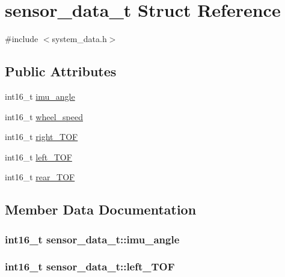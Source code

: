 \hypertarget{structsensor__data__t}{}\section{sensor\+\_\+data\+\_\+t Struct Reference}
\label{structsensor__data__t}


{\ttfamily \#include $<$system\+\_\+data.\+h$>$}

\subsection*{Public Attributes}
\begin{DoxyCompactItemize}
\item 
int16\+\_\+t \hyperlink{structsensor__data__t_aba3eb0564055c7b08a699140643a1917}{imu\+\_\+angle}
\item 
int16\+\_\+t \hyperlink{structsensor__data__t_a9bf1052ed7b8733732b86a5514bffa67}{wheel\+\_\+speed}
\item 
int16\+\_\+t \hyperlink{structsensor__data__t_a0a5ace9e72835c96a0620b148309df1e}{right\+\_\+\+T\+OF}
\item 
int16\+\_\+t \hyperlink{structsensor__data__t_a72dfbfa55e91dab205cf7293f9b74e00}{left\+\_\+\+T\+OF}
\item 
int16\+\_\+t \hyperlink{structsensor__data__t_a8edb05e5c8377d9faf2b12e4e3250c6c}{rear\+\_\+\+T\+OF}
\end{DoxyCompactItemize}


\subsection{Member Data Documentation}
\subsubsection[{\texorpdfstring{imu\+\_\+angle}{imu_angle}}]{\setlength{\rightskip}{0pt plus 5cm}int16\+\_\+t sensor\+\_\+data\+\_\+t\+::imu\+\_\+angle}\hypertarget{structsensor__data__t_aba3eb0564055c7b08a699140643a1917}{}\label{structsensor__data__t_aba3eb0564055c7b08a699140643a1917}
\subsubsection[{\texorpdfstring{left\+\_\+\+T\+OF}{left_TOF}}]{\setlength{\rightskip}{0pt plus 5cm}int16\+\_\+t sensor\+\_\+data\+\_\+t\+::left\+\_\+\+T\+OF}\hypertarget{structsensor__data__t_a72dfbfa55e91dab205cf7293f9b74e00}{}\label{structsensor__data__t_a72dfbfa55e91dab205cf7293f9b74e00}
